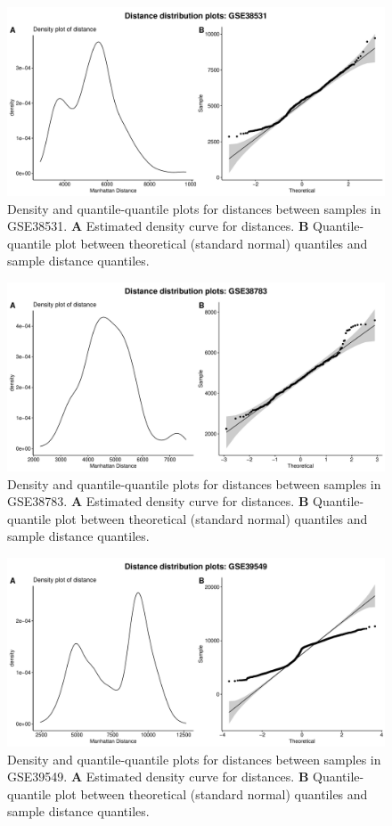 \documentclass[10pt,letterpaper]{article}\usepackage[]{graphicx}\usepackage[]{color}
\begin{document}
\begin{figure}[H]
	\includegraphics[width=\textwidth]{manhattan-distance_hist_GSE38531.pdf}
	\caption{Density and quantile-quantile plots for distances between samples in GSE38531. \textbf{A} Estimated density curve for distances. \textbf{B} Quantile-quantile plot between theoretical (standard normal) quantiles and sample distance quantiles.}
\end{figure}

\begin{figure}[H]
	\includegraphics[width=\textwidth]{manhattan-distance_hist_GSE38783.pdf}
	\caption{Density and quantile-quantile plots for distances between samples in GSE38783. \textbf{A} Estimated density curve for distances. \textbf{B} Quantile-quantile plot between theoretical (standard normal) quantiles and sample distance quantiles.}
\end{figure}

\begin{figure}[H]
	\includegraphics[width=\textwidth]{manhattan-distance_hist_GSE39549.pdf}
	\caption{Density and quantile-quantile plots for distances between samples in GSE39549. \textbf{A} Estimated density curve for distances. \textbf{B} Quantile-quantile plot between theoretical (standard normal) quantiles and sample distance quantiles.}
\end{figure}
\end{document}

